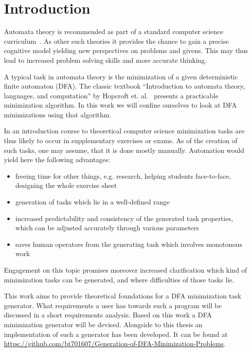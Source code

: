 
\chapter{Introduction} \label{ch:1}


Automata theory is recommended as part of a standard computer science curriculum~\cite[pp. 5-6]{GI16}. As other such theories it provides the chance to gain a precise cognitive model yielding new perspectives on problems and givens. This may thus lead to increased problem solving skills and more accurate thinking.


A typical task in automata theory is the minimization of a given deterministic finite automaton (DFA). The classic textbook ``Introduction to automata theory, languages, and computation'' by Hopcroft et. al.~\cite{HMU01} presents a practicable minimization algorithm. In this work we will confine ourselves to look at DFA minimizations using that algorithm.


In an introduction course to theoretical computer science minimization tasks are thus likely to occur in supplementary exercises or exams. As of the creation of such tasks, one may assume, that it is done mostly manually. Automation would yield here the following advantages:

\begin{itemize}
	\item freeing time for other things, e.g. research, helping students face-to-face, designing the whole exercise sheet
	
	\item generation of tasks which lie in a well-defined range
	
	\item increased predictability and consistency of the generated task properties, which can be adjusted accurately through various parameters
	
	\item saves human operators from the generating task which involves monotonous work
\end{itemize}
Engagement on this topic promises moreover increased clarification which kind of minimization tasks can be generated, and where difficulties of those tasks lie.

This work aims to provide theoretical foundations for a DFA minimization task generator. What requirements a user has towards such a program will be discussed in a short requirements analysis. Based on this work a DFA minimization generator will be devised. Alongside to this thesis an implementation of such a generator has been developed. It can be found at \url{https://github.com/bt701607/Generation-of-DFA-Minimization-Problems}.
